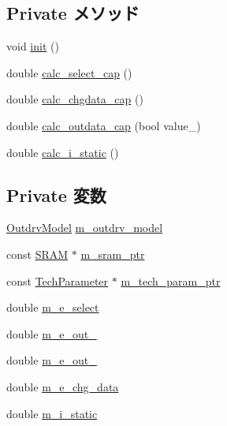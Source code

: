 \subsection*{Private メソッド}
\begin{DoxyCompactItemize}
\item 
void \hyperlink{classOutdrvUnit_a02fd73d861ef2e4aabb38c0c9ff82947}{init} ()
\item 
double \hyperlink{classOutdrvUnit_a874bd4e177d9811be815cbf21521c785}{calc\_\-select\_\-cap} ()
\item 
double \hyperlink{classOutdrvUnit_a8726a71f007fe9b33264bb99f11ed10f}{calc\_\-chgdata\_\-cap} ()
\item 
double \hyperlink{classOutdrvUnit_a354dc4ee2b45109142f891c166d1cb7b}{calc\_\-outdata\_\-cap} (bool value\_\-)
\item 
double \hyperlink{classOutdrvUnit_a0027807356ac4ca07fe2e593234eb884}{calc\_\-i\_\-static} ()
\end{DoxyCompactItemize}
\subsection*{Private 変数}
\begin{DoxyCompactItemize}
\item 
\hyperlink{classOutdrvUnit_acf5fc301c3542e694b0cec063a8d92c5}{OutdrvModel} \hyperlink{classOutdrvUnit_a4409528e1df87c5de3763a3b45334500}{m\_\-outdrv\_\-model}
\item 
const \hyperlink{classSRAM}{SRAM} $\ast$ \hyperlink{classOutdrvUnit_aab5dce4213ab482c5e1909bfc96d62af}{m\_\-sram\_\-ptr}
\item 
const \hyperlink{classTechParameter}{TechParameter} $\ast$ \hyperlink{classOutdrvUnit_a11d1644aa2bfe0e16783dface6fadf13}{m\_\-tech\_\-param\_\-ptr}
\item 
double \hyperlink{classOutdrvUnit_a402c958b93bf2d08049bbde4b01ceb53}{m\_\-e\_\-select}
\item 
double \hyperlink{classOutdrvUnit_a954d875d395dbe65c9eee296593ff5d9}{m\_\-e\_\-out\_}
\item 
double \hyperlink{classOutdrvUnit_a9aa0e9a7c4729461d9732c8f708fcbd9}{m\_\-e\_\-out\_}
\item 
double \hyperlink{classOutdrvUnit_a571440444bf826710b9fb22fa232c684}{m\_\-e\_\-chg\_\-data}
\item 
double \hyperlink{classOutdrvUnit_a16f0c9e5942378eab4d83da3c61aba7f}{m\_\-i\_\-static}
\end{DoxyCompactItemize}


